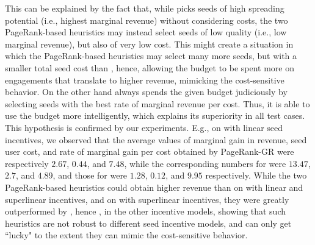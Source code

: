  This can be explained by the fact that, while \fastca picks seeds of high spreading potential (i.e., highest marginal revenue) without considering costs, the two PageRank-based heuristics may instead select seeds of low quality (i.e., low marginal revenue), but also of very low cost. This might create a situation in which the PageRank-based heuristics may select many more seeds, but with a smaller total seed cost than \fastca, hence, allowing the budget to be spent more on engagements that translate to higher revenue, mimicking the cost-sensitive behavior. On the other hand \fastcs always spends the given budget judiciously by selecting seeds with the best rate of marginal revenue per cost. Thus, it is able to use the budget more intelligently, which explains its superiority in all test cases. This hypothesis is confirmed by our experiments. E.g., on \flix with linear seed incentives, we observed that the average values of marginal gain in revenue, seed user cost, and rate of marginal gain per cost obtained by PageRank-GR were respectively $2.67$, $0.44$, and $7.48$, while the corresponding numbers  for \fastca were $13.47$, $2.7$, and $4.89$, and those for \fastcs were $1.28$, $0.12$, and $9.95$ respectively. While the two PageRank-based heuristics could obtain higher revenue than \fastca on \flix with linear and superlinear incentives, and on \epi with superlinear incentives, they were greatly outperformed by \fastca, hence \fastcs, in the other incentive models, showing that such heuristics are not robust to different seed incentive models, and can only get ``lucky" to the extent they can mimic the cost-sensitive behavior.

